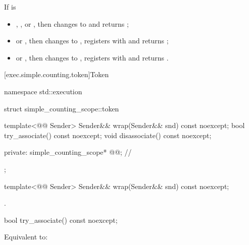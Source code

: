 \begin{itemdescr}
\pnum
\effects
If  is
\begin{itemize}
\item
{}, , or , then
changes  to  and returns ;
\item
{} or , then
changes  to ,
registers  with  and returns ;
\item
{} or , then
changes  to ,
registers  with  and returns .
\end{itemize}
\end{itemdescr}

[exec.simple.counting.token]{Token}

%
\begin{codeblock}
namespace std::execution {
  struct simple_counting_scope::token {
    template<@@ Sender>
      Sender&& wrap(Sender&& snd) const noexcept;
    bool try_associate() const noexcept;
    void disassociate() const noexcept;

  private:
    simple_counting_scope* @@;   // \expos
  };
}
\end{codeblock}

%
\begin{itemdecl}
template<@@ Sender>
  Sender&& wrap(Sender&& snd) const noexcept;
\end{itemdecl}

\begin{itemdescr}
\pnum
\returns
{}.
\end{itemdescr}

%
\begin{itemdecl}
bool try_associate() const noexcept;
\end{itemdecl}

\begin{itemdescr}
\pnum
\effects
Equivalent to: 
\end{itemdescr}

